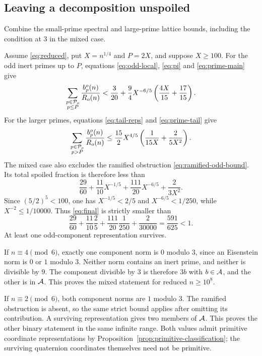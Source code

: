 \subsection{Leaving a decomposition unspoiled}\label{sec:infinite}
Combine the small-prime spectral and large-prime lattice bounds,
including the condition at \(3\) in the mixed case.

Assume \eqref{eq:reduced}, put $X=n^{1/4}$ and $P=2X$, and suppose
$X\ge100$. For the odd inert primes up to $P$, equations
\eqref{eq:odd-local}, \eqref{eq:pi} and \eqref{eq:prime-main} give
\[
\sum_{\substack{p\in\PP_o\\p\le P}}\frac{b_p^o(n)}{R_o(n)}
<\frac3{20}+\frac94 X^{-6/5}
\left(\frac{4X}{15}+\frac{17}{15}\right).
\]
For the larger primes, equations \eqref{eq:tail-reps} and
\eqref{eq:prime-tail} give
\[
\sum_{\substack{p\in\PP_o\\p>P}}\frac{b_p^o(n)}{R_o(n)}
\le\frac{15}{2}X^{4/5}
\left(\frac1{15X}+\frac2{5X^2}\right).
\]
The mixed case also excludes the ramified obstruction
\eqref{eq:ramified-odd-bound}. Its total spoiled fraction is therefore
less than
\begin{equation}\label{eq:final}
\frac{29}{60}+\frac{11}{10}X^{-1/5}
+\frac{111}{20}X^{-6/5}+\frac{2}{3X^2}.
\end{equation}
Since $(5/2)^5<100$, one has $X^{-1/5}<2/5$ and
$X^{-6/5}<1/250$, while $X^{-2}\le1/10000$. Thus \eqref{eq:final} is
strictly smaller than
\[
\frac{29}{60}+\frac{11}{10}\frac25+
\frac{111}{20}\frac1{250}+\frac2{30000}
=\frac{591}{625}<1.
\]
At least one odd-component representation survives.

If $n\equiv4\pmod6$, exactly one component norm is $0$ modulo $3$,
since an Eisenstein norm is $0$ or $1$ modulo $3$. Neither norm contains
an inert prime, and neither is divisible by $9$. The component divisible
by $3$ is therefore $3b$ with $b\in\AA$, and the other is in $\AA$.
This proves the mixed statement for reduced $n\ge10^8$.

If $n\equiv2\pmod6$, both component norms are $1$ modulo $3$.
The ramified obstruction is absent, so the same strict bound applies
after omitting its contribution. A surviving representation gives two
members of $\AA$. This proves the other binary statement in the same
infinite range. Both values admit primitive coordinate representations
by Proposition~\ref{prop:primitive-classification}; the surviving
quaternion coordinates themselves need not be primitive.
